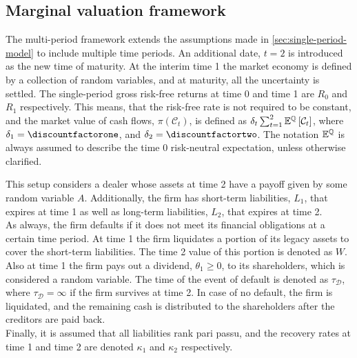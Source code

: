 \documentclass[main.tex]{subfiles}
\begin{document}
    \subsection{Marginal valuation framework}
        The multi-period framework extends the assumptions made in \cref{sec:single-period-model} to include multiple time periods.
        An additional date, $t=2$ is introduced as the new time of maturity.
        At the interim time 1 the market economy is defined by a collection of random variables,
        and at maturity, all the uncertainty is settled. 
        The single-period gross risk-free returns at time 0 and time 1 are $R_0$ and $R_1$ respectively.
        This means, that the risk-free rate is not required to be constant,
        and the market value of cash flows,
        $\pi(\mathcal{C}_{t})$, is defined as
        $\delta_t \sum_{t=1}^{2}\mathbb{E}^{\mathbb{Q}}\left[\mathcal{C}_{t}\right]$,
        where $\delta_1 = \discountfactorone$,
        and $\delta_2 = \discountfactortwo$.
        The notation $\mathbb{E}^{\mathbb{Q}}$ is always assumed to describe the time 0 risk-neutral expectation, unless otherwise clarified.

        This setup considers a dealer whose assets at time 2 have a payoff given by some random variable $A$.
        Additionally, the firm has short-term liabilities, $L_1$, that expires at time 1 as well as long-term liabilities, $L_2$, that expires at time 2.
        \\
        As always, the firm defaults if it does not meet its financial obligations at a certain time period.
        At time 1 the firm liquidates a portion of its legacy assets to cover the short-term liabilities.
        The time 2 value of this portion is denoted as $W$.
        Also at time 1 the firm pays out a dividend, $\theta_1 \geq 0$, to its shareholders,
        which is considered a random variable.
        The time of the event of default is denoted as $\tau_{\mathcal{D}}$,
        where $\tau_{\mathcal{D}} = \infty$ if the firm survives at time 2.
        In case of no default, the firm is liquidated, and the remaining cash is distributed to the shareholders after the creditors are paid back.
        \\
        Finally, it is assumed that all liabilities rank pari passu,
        and the recovery rates at time 1 and time 2 are denoted $\kappa_1$ and $\kappa_2$ respectively.
\end{document}
